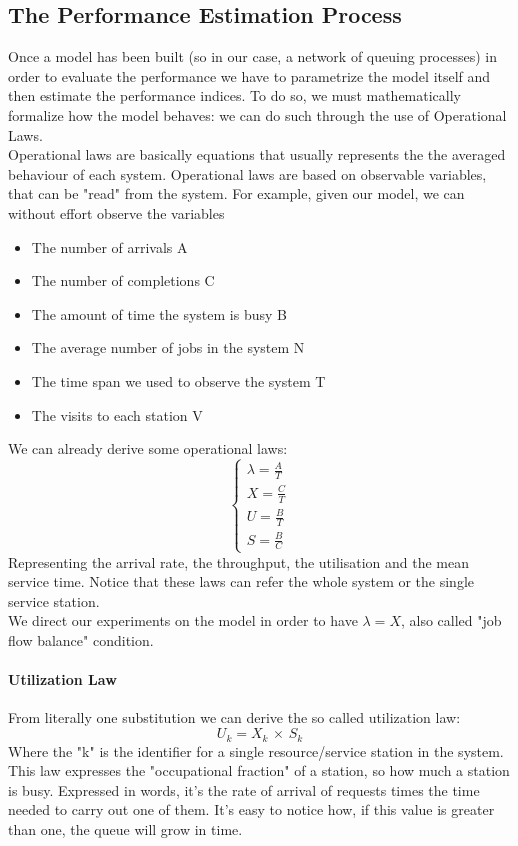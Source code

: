 \documentclass[10pt,a4paper]{article}
\begin{document}
			\subsection{The Performance Estimation Process}
				Once a model has been built (so in our case, a network of queuing processes) in order to evaluate the performance we have to parametrize the model itself and then estimate the performance indices. To do so, we must mathematically formalize how the model behaves: we can do such through the use of Operational Laws.\\
				Operational laws are basically equations that usually represents the the averaged behaviour of each system. Operational laws are based on observable variables, that can be "read" from the system. For example, given our model, we can without effort observe the variables
				\begin{itemize}
					\item The number of arrivals A
					\item The number of completions C
					\item The amount of time the system is busy B
					\item The average number of jobs in the system N
					\item The time span we used to observe the system T
					\item The visits to each station V
				\end{itemize}
				We can already derive some operational laws:
				\begin{equation}
					\begin{cases}
						\lambda = \frac{A}{T} \\
						X = \frac{C}{T} \\
						U = \frac{B}{T} \\
						S = \frac{B}{C}
					\end{cases}
				\end{equation}
				Representing the arrival rate, the throughput, the utilisation and the mean service time. Notice that these laws can refer the whole system or the single service station.\\
				We direct our experiments on the model in order to have $\lambda = X$, also called "job flow balance" condition.
				
				\paragraph{Utilization Law}
					From literally one substitution we can derive the so called utilization law:
					\begin{equation}
						U_k = X_k \,\times\, S_k
					\end{equation} 
					Where the "k" is the identifier for a single resource/service station in the system. This law expresses the "occupational fraction" of a station, so how much a station is busy. Expressed in words, it's the rate of arrival of requests times the time needed to carry out one of them. It's easy to notice how, if this value is greater than one, the queue will grow in time.
					
\end{document}
